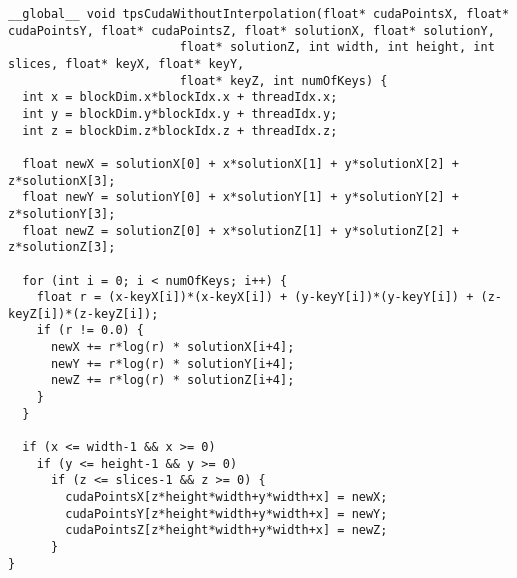 \begin{lstlisting}[label={code:tpsNoInter}, caption={Kernel sem a interpolação trilinear}]
__global__ void tpsCudaWithoutInterpolation(float* cudaPointsX, float* cudaPointsY, float* cudaPointsZ, float* solutionX, float* solutionY,
                        float* solutionZ, int width, int height, int slices, float* keyX, float* keyY,
                        float* keyZ, int numOfKeys) {
  int x = blockDim.x*blockIdx.x + threadIdx.x;
  int y = blockDim.y*blockIdx.y + threadIdx.y;
  int z = blockDim.z*blockIdx.z + threadIdx.z;

  float newX = solutionX[0] + x*solutionX[1] + y*solutionX[2] + z*solutionX[3];
  float newY = solutionY[0] + x*solutionY[1] + y*solutionY[2] + z*solutionY[3];
  float newZ = solutionZ[0] + x*solutionZ[1] + y*solutionZ[2] + z*solutionZ[3];

  for (int i = 0; i < numOfKeys; i++) {
    float r = (x-keyX[i])*(x-keyX[i]) + (y-keyY[i])*(y-keyY[i]) + (z-keyZ[i])*(z-keyZ[i]);
    if (r != 0.0) {
      newX += r*log(r) * solutionX[i+4];
      newY += r*log(r) * solutionY[i+4];
      newZ += r*log(r) * solutionZ[i+4];
    }
  }

  if (x <= width-1 && x >= 0)
    if (y <= height-1 && y >= 0)
      if (z <= slices-1 && z >= 0) {
        cudaPointsX[z*height*width+y*width+x] = newX;
        cudaPointsY[z*height*width+y*width+x] = newY;
        cudaPointsZ[z*height*width+y*width+x] = newZ;
      }
}
\end{lstlisting}

